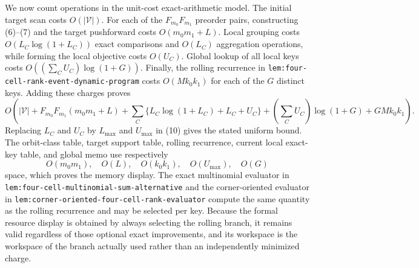 We now count operations in the unit-cost exact-arithmetic model. The initial target scan costs \(O(|\mathcal V|)\). For each of the \(F_{m_0}F_{m_1}\) preorder pairs, constructing (6)--(7) and the target pushforward costs \(O(m_0m_1+L)\). Local grouping costs \(O(L_C\log(1+L_C))\) exact comparisons and \(O(L_C)\) aggregation operations, while forming the local objective costs \(O(U_C)\). Global lookup of all local keys costs \(O((\sum_CU_C)\log(1+G))\). Finally, the rolling recurrence in \texttt{lem:four-cell-rank-event-dynamic-program} costs \(O(Mk_0k_1)\) for each of the \(G\) distinct keys. Adding these charges proves
\[
O\!\left(|\mathcal V|+F_{m_0}F_{m_1}(m_0m_1+L)+\sum_C\{L_C\log(1+L_C)+L_C+U_C\}+\left(\sum_CU_C\right)\log(1+G)+GMk_0k_1\right).
\tag{10}
\]
Replacing \(L_C\) and \(U_C\) by \(L_{\max}\) and \(U_{\max}\) in (10) gives the stated uniform bound. The orbit-class table, target support table, rolling recurrence, current local exact-key table, and global memo use respectively
\[
O(m_0m_1),\quad O(L),\quad O(k_0k_1),\quad O(U_{\max}),\quad O(G)
\tag{11}
\]
space, which proves the memory display. The exact multinomial evaluator in \texttt{lem:four-cell-multinomial-sum-alternative} and the corner-oriented evaluator in \texttt{lem:corner-oriented-four-cell-rank-evaluator} compute the same quantity as the rolling recurrence and may be selected per key. Because the formal resource display is obtained by always selecting the rolling branch, it remains valid regardless of those optional exact improvements, and its workspace is the workspace of the branch actually used rather than an independently minimized charge.